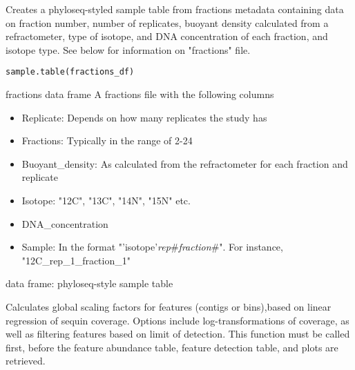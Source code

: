 \documentclass[a4paper]{book}
\begin{document}
%
\begin{Description}\relax
Creates a phyloseq-styled sample table from fractions metadata
containing data on fraction number, number of replicates, buoyant density
calculated from a refractometer, type of isotope, and DNA concentration
of each fraction, and isotope type. See below for information on "fractions" file.
\end{Description}
%
\begin{Usage}
\begin{verbatim}
sample.table(fractions_df)
\end{verbatim}
\end{Usage}
%
\begin{Arguments}
\begin{ldescription}
\item[\code{fractions\_df}] fractions data frame
A fractions file with the following columns
\begin{itemize}

\item{} Replicate: Depends on how many replicates the study has
\item{} Fractions: Typically in the range of 2-24
\item{} Buoyant\_density: As calculated from the refractometer for each fraction and replicate
\item{} Isotope: "12C", "13C", "14N", "15N" etc.
\item{} DNA\_concentration
\item{} Sample: In the format "'isotope'\emph{rep}\#\emph{fraction}\#".
For instance, "12C\_rep\_1\_fraction\_1"

\end{itemize}

\end{ldescription}
\end{Arguments}
%
\begin{Value}
data  frame: phyloseq-style sample table
\end{Value}
%
\begin{Description}\relax
Calculates global scaling factors for features (contigs or bins),based on linear regression of sequin coverage. Options include log-transformations of coverage, as well as filtering features based on limit of detection. This function must be called first, before the feature abundance table, feature detection table, and plots are retrieved.
\end{Description}
\end{document}
